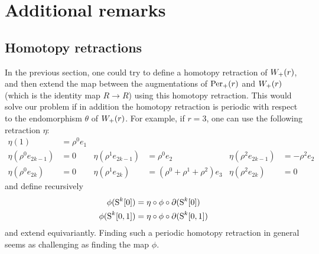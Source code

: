 
\section{Additional remarks}

\subsection{Homotopy retractions}\label{s:hretractions} In the previous section, one could try to define a homotopy retraction of $W_+(r)$, and then extend the map between the augmentations of $\mathrm{Per}_+(r)$ and $W_+(r)$ (which is the identity map $R\to R$) using this homotopy retraction. This would solve our problem if in addition the homotopy retraction is periodic with respect to the endomorphism $\theta$ of $W_+(r)$. For example, if $r=3$, one can use the following retraction $\eta$:
\begin{align*}
	\eta(1) &= \rho^0e_1 
	\\
	\eta(\rho^0e_{2k-1}) &= 0
	&
	\eta(\rho^1e_{2k-1}) &= \rho^0e_2
	&
	\eta(\rho^2e_{2k-1}) &= -\rho^2e_2
	\\
	\eta(\rho^0e_{2k}) &= 0 
	&
	\eta(\rho^1e_{2k}) &= (\rho^0+\rho^1+\rho^2)e_3
	&
	\eta(\rho^2e_{2k}) &= 0 
\end{align*}  
and define recursively 
\begin{align*}
	\phi(\operatorname{S}^{k}[0]) &= \eta\circ \phi \circ \partial(\operatorname{S}^{k}[0])
	\\
	\phi(\operatorname{S}^{k}[0,1]) &= \eta\circ \phi \circ \partial(\operatorname{S}^{k}[0,1])
\end{align*}
and extend equivariantly. Finding such a periodic homotopy retraction in general seems as challenging as finding the map $\phi$.


